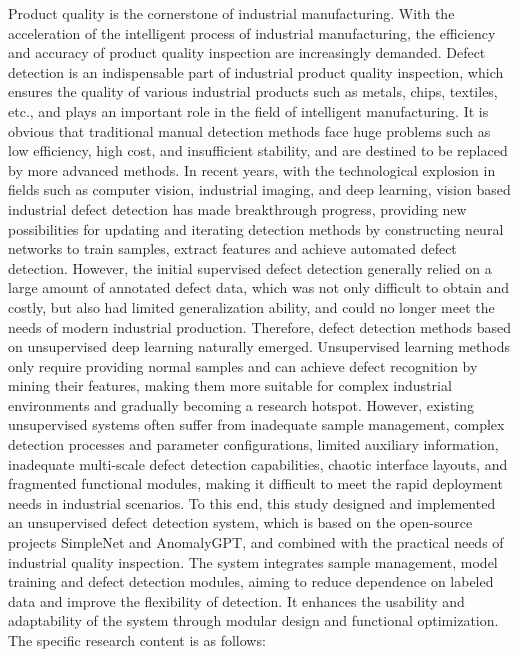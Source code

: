 \documentclass[
  ]{njuthesis}
\begin{document}
\begin{abstract*}
Product quality is the cornerstone of industrial manufacturing. With the acceleration of the intelligent process of industrial manufacturing, the efficiency and accuracy of product quality inspection are increasingly demanded. Defect detection is an indispensable part of industrial product quality inspection, which ensures the quality of various industrial products such as metals, chips, textiles, etc., and plays an important role in the field of intelligent manufacturing. It is obvious that traditional manual detection methods face huge problems such as low efficiency, high cost, and insufficient stability, and are destined to be replaced by more advanced methods. In recent years, with the technological explosion in fields such as computer vision, industrial imaging, and deep learning, vision based industrial defect detection has made breakthrough progress, providing new possibilities for updating and iterating detection methods by constructing neural networks to train samples, extract features and achieve automated defect detection. However, the initial supervised defect detection generally relied on a large amount of annotated defect data, which was not only difficult to obtain and costly, but also had limited generalization ability, and could no longer meet the needs of modern industrial production. Therefore, defect detection methods based on unsupervised deep learning naturally emerged. Unsupervised learning methods only require providing normal samples and can achieve defect recognition by mining their features, making them more suitable for complex industrial environments and gradually becoming a research hotspot. However, existing unsupervised systems often suffer from inadequate sample management, complex detection processes and parameter configurations, limited auxiliary information, inadequate multi-scale defect detection capabilities, chaotic interface layouts, and fragmented functional modules, making it difficult to meet the rapid deployment needs in industrial scenarios. To this end, this study designed and implemented an unsupervised defect detection system, which is based on the open-source projects SimpleNet and AnomalyGPT, and combined with the practical needs of industrial quality inspection. The system integrates sample management, model training and defect detection modules, aiming to reduce dependence on labeled data and improve the flexibility of detection. It enhances the usability and adaptability of the system through modular design and functional optimization. The specific research content is as follows:


\end{abstract*}
\end{document}
